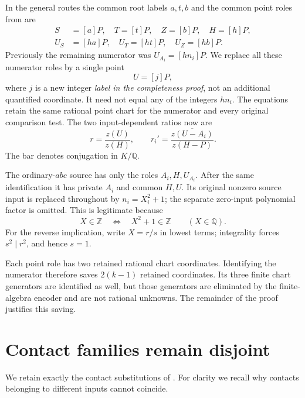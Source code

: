 \documentclass[11pt]{article}
\newcommand{\Q}{\mathbb Q}
\newcommand{\Z}{\mathbb Z}
\begin{document}
In the general routes the common root labels \(a,t,b\) and the
common point roles from \cite{shared} are
\[
\begin{split}
 S&=[a]P,\quad T=[t]P,\quad Z=[b]P,\quad H=[h]P,\\
 U_S&=[ha]P,\quad U_T=[ht]P,\quad U_Z=[hb]P.
\end{split}
\]
Previously the remaining numerator was \(U_{A_i}=[hn_i]P\).
We replace all these numerator roles by a single point
\[
                              U=[j]P,
\]
where \(j\) is a new integer \emph{label in the completeness proof},
not an additional quantified coordinate. It need not equal any
of the integers \(hn_i\). The equations retain the same rational
point chart for the numerator and every original comparison test.
The two input-dependent ratios now are
\begin{equation}\label{eq:ratios}
 r=\frac{z(U)}{z(H)},\qquad
 r_i'=\overline{\frac{z(U-A_i)}{z(H-P)}}.
\end{equation}
The bar denotes conjugation in \(K/\Q\).

The ordinary-\(abc\) source has only the roles \(A_i,H,U_{A_i}\).
After the same identification it has private \(A_i\) and common
\(H,U\). Its original nonzero source input is replaced throughout
by \(n_i=X_i^2+1\); the separate zero-input polynomial factor is
omitted. This is legitimate because
\[
              X\in\Z\quad\Longleftrightarrow\quad X^2+1\in\Z
              \qquad(X\in\Q).
\]
For the reverse implication, write \(X=r/s\) in lowest terms;
integrality forces \(s^2\mid r^2\), and hence \(s=1\).

Each point role has two retained rational chart coordinates.
Identifying the numerator therefore saves \(2(k-1)\) retained
coordinates. Its three finite chart generators are identified as
well, but those generators are eliminated by the finite-algebra
encoder and are not rational unknowns. The remainder of the proof
justifies this saving.

\section{Contact families remain disjoint}
\label{sec:contacts}

We retain exactly the contact substitutions of \cite{shared}.
For clarity we recall why contacts belonging to different inputs
cannot coincide.
\end{document}
